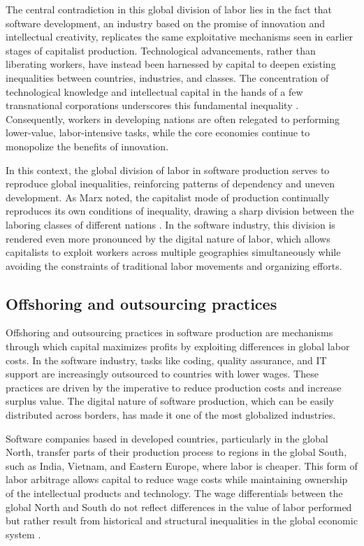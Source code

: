 The central contradiction in this global division of labor lies in the fact that software development, an industry based on the promise of innovation and intellectual creativity, replicates the same exploitative mechanisms seen in earlier stages of capitalist production. Technological advancements, rather than liberating workers, have instead been harnessed by capital to deepen existing inequalities between countries, industries, and classes. The concentration of technological knowledge and intellectual capital in the hands of a few transnational corporations underscores this fundamental inequality \cite[pp.~134-136]{mosco2009}. Consequently, workers in developing nations are often relegated to performing lower-value, labor-intensive tasks, while the core economies continue to monopolize the benefits of innovation.

In this context, the global division of labor in software production serves to reproduce global inequalities, reinforcing patterns of dependency and uneven development. As Marx noted, the capitalist mode of production continually reproduces its own conditions of inequality, drawing a sharp division between the laboring classes of different nations \cite[pp.~482-485]{marx1976}. In the software industry, this division is rendered even more pronounced by the digital nature of labor, which allows capitalists to exploit workers across multiple geographies simultaneously while avoiding the constraints of traditional labor movements and organizing efforts.

\subsection{Offshoring and outsourcing practices}

Offshoring and outsourcing practices in software production are mechanisms through which capital maximizes profits by exploiting differences in global labor costs. In the software industry, tasks like coding, quality assurance, and IT support are increasingly outsourced to countries with lower wages. These practices are driven by the imperative to reduce production costs and increase surplus value. The digital nature of software production, which can be easily distributed across borders, has made it one of the most globalized industries.

Software companies based in developed countries, particularly in the global North, transfer parts of their production process to regions in the global South, such as India, Vietnam, and Eastern Europe, where labor is cheaper. This form of labor arbitrage allows capital to reduce wage costs while maintaining ownership of the intellectual products and technology. The wage differentials between the global North and South do not reflect differences in the value of labor performed but rather result from historical and structural inequalities in the global economic system \cite[pp.~45-47]{smith2016}. 

